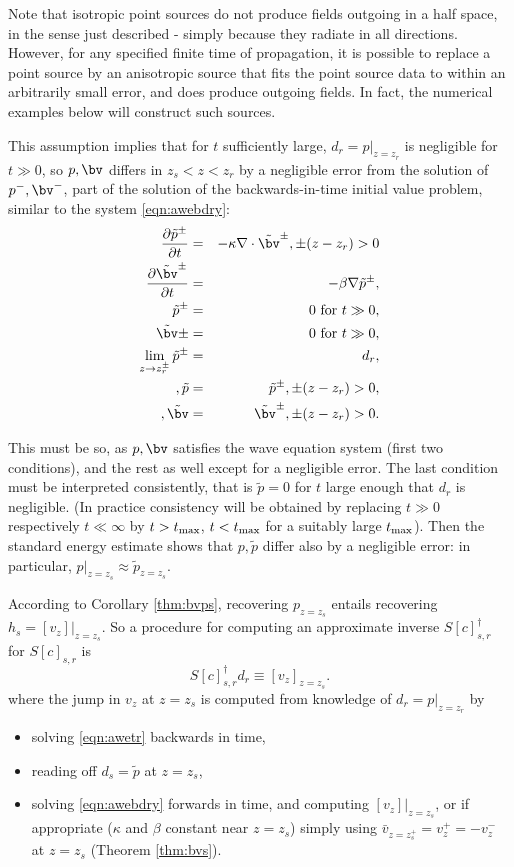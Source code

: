 Note that isotropic point sources do not produce fields outgoing in a half space, in the sense just described - simply because they radiate in all directions. However, for any specified finite time of propagation, it is possible to replace a point source by an anisotropic source that fits the point source data to within an arbitrarily small error, and does produce outgoing fields. In fact, the numerical examples below will construct such sources. 

This assumption implies that for $t$ sufficiently large, $d_r = p|_{z=z_r}$ is negligible for $t \gg 0$, so $p,\bv$ differs in $z_s<z < z_r$ by a negligible error from the solution of $p^-,\bv^-$, part of the solution of the  backwards-in-time  initial value problem, similar to the system \ref{eqn:awebdry}:
\begin{eqnarray}
\label{eqn:awetr}
\frac{\partial \tilde{p}^{\pm}}{\partial t} & = & - \kappa \nabla \cdot \tilde{\bv}^{\pm}, \pm(z-z_r)>0 \nonumber \\
\frac{\partial \tilde{\bv}^{\pm}}{\partial t} & = & - \beta \nabla \tilde{p}^{\pm},\nonumber \\
\tilde{p}^{\pm} & =& 0 \mbox{ for } t \gg 0,\nonumber\\ 
\tilde{\bv}{\pm} & = & 0 \mbox{ for } t \gg 0,\nonumber\\
\lim_{z \rightarrow z_r^{\pm}}\tilde{p}^{\pm} &=&  d_r, \nonumber\\,
\tilde{p} &=& \tilde{p}^{\pm}, \pm(z-z_r)>0, \nonumber\\, 
\tilde{\bv} &=& \tilde{\bv}^{\pm}, \pm(z-z_r)>0.
\end{eqnarray} 

This must be so, as $p,\bv$ satisfies the wave equation system (first two conditions), and the rest as well except for a negligible error. The last condition must be interpreted consistently, that is $\tilde{p}=0$ for $t$ large enough that $d_r$ is negligible. (In practice consistency will be obtained by replacing $t \gg 0$ respectively $t \ll \infty$ by $t > t_{\rm max}$, $t < t_{\rm max}$ for a suitably large $t_{\rm max}$). Then the standard energy estimate shows that $p, \tilde{p}$ differ also by a negligible error: in particular, $p|_{z=z_s} \approx \tilde{p}_{z=z_s}$.

According to Corollary \ref{thm:bvps}, recovering $p_{z=z_s}$ entails recovering $h_s=[v_z]|_{z=z_s}$. So a procedure for computing an approximate inverse $S[c]_{s,r}^{\dagger}$ for $S[c]_{s,r}$ is 
\begin{equation}
\label{eqn:psinv}
S[c]_{s,r}^{\dagger}d_r\equiv [v_z]_{z=z_s}.
\end{equation}
where the jump in $v_z$ at $z=z_s$ is computed from knowledge of $d_r=p|_{z=z_r}$ by
\begin{itemize}
\item solving \ref{eqn:awetr} backwards in time,
\item reading off $d_s=\tilde{p}$ at $z=z_s$,
\item solving \ref{eqn:awebdry} forwards in time, and computing $[v_z]|_{z=z_s}$, or if appropriate ($\kappa$ and $\beta$ constant near $z=z_s$) simply using $\bar{v}_{z=z_s^+} = v_z^{+}=-v_z^{-}$ at $z=z_s$ (Theorem \ref{thm:bvs}).
\end{itemize}

